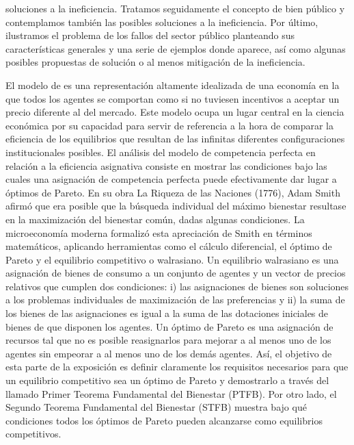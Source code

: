 \documentclass{nuevotema}
\begin{document}
soluciones a la ineficiencia. Tratamos seguidamente el concepto de bien público y contemplamos también las posibles soluciones a la ineficiencia. Por último, ilustramos el problema de los fallos del sector público planteando sus características generales y una serie de ejemplos donde aparece, así como algunas posibles propuestas de solución o al menos mitigación de la ineficiencia. 

El modelo de  es una representación altamente idealizada de una economía en la que todos los agentes se comportan como si no tuviesen incentivos a aceptar un precio diferente al del mercado. Este modelo ocupa un lugar central en la ciencia económica por su capacidad para servir de referencia a la hora de comparar la eficiencia de los equilibrios que resultan de las infinitas diferentes configuraciones institucionales posibles. El análisis del modelo de competencia perfecta en relación a la eficiencia asignativa consiste en mostrar las condiciones bajo las cuales una asignación de competencia perfecta puede efectivamente dar lugar a óptimos de Pareto. En su obra La Riqueza de las Naciones (1776), Adam Smith afirmó que era posible que la búsqueda individual del máximo bienestar resultase en la maximización del bienestar común, dadas algunas condiciones. La microeconomía moderna formalizó esta apreciación de Smith en términos matemáticos, aplicando herramientas como el cálculo diferencial, el óptimo de Pareto y el equilibrio competitivo o walrasiano. Un equilibrio walrasiano es una asignación de bienes de consumo a un conjunto de agentes y un vector de precios relativos que cumplen dos condiciones: i) las asignaciones de bienes son soluciones a los problemas individuales de maximización de las preferencias y ii) la suma de los bienes de las asignaciones es igual a la suma de las dotaciones iniciales de bienes de que disponen los agentes. Un óptimo de Pareto es una asignación de recursos tal que no es posible reasignarlos para mejorar a al menos uno de los agentes sin empeorar a al menos uno de los demás agentes. Así, el objetivo de esta parte de la exposición es definir claramente los requisitos necesarios para que un equilibrio competitivo sea un óptimo de Pareto y demostrarlo a través del llamado Primer Teorema Fundamental del Bienestar (PTFB). Por otro lado, el Segundo Teorema Fundamental del Bienestar (STFB) muestra bajo qué condiciones todos los óptimos de Pareto pueden alcanzarse como equilibrios competitivos. 
\end{document}
